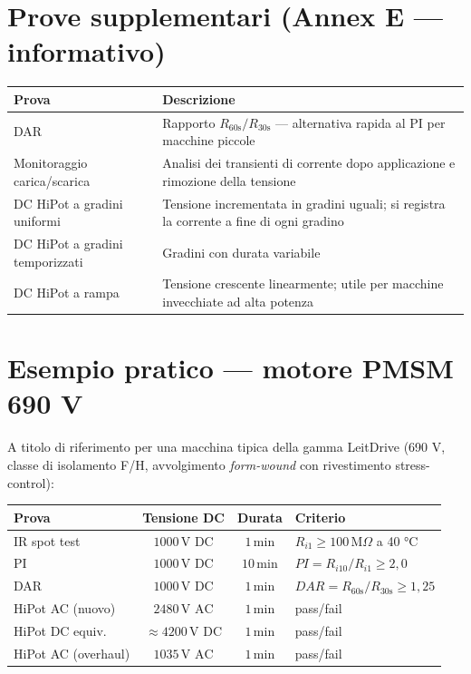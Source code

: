 \documentclass[a4paper,11pt]{article}
\begin{document}
\section{Prove supplementari (Annex E — informativo)}

\begin{center}
\begin{tabularx}{\linewidth}{lX}
\toprule
\textbf{Prova} & \textbf{Descrizione} \\
\midrule
DAR                    & Rapporto $R_{60\text{s}}/R_{30\text{s}}$ — alternativa rapida al PI per macchine piccole \\
Monitoraggio carica/scarica & Analisi dei transienti di corrente dopo applicazione e rimozione della tensione \\
DC HiPot a gradini uniformi & Tensione incrementata in gradini uguali; si registra la corrente a fine di ogni gradino \\
DC HiPot a gradini temporizzati & Gradini con durata variabile \\
DC HiPot a rampa       & Tensione crescente linearmente; utile per macchine invecchiate ad alta potenza \\
\bottomrule
\end{tabularx}
\end{center}

\section{Esempio pratico — motore PMSM 690 V}

A titolo di riferimento per una macchina tipica della gamma LeitDrive (690 V, classe di isolamento F/H, avvolgimento \emph{form-wound} con rivestimento stress-control):

\begin{center}
\begin{tabular}{lccl}
\toprule
\textbf{Prova} & \textbf{Tensione DC} & \textbf{Durata} & \textbf{Criterio} \\
\midrule
IR spot test  & $1000\,\text{V DC}$ & $1\,\text{min}$  & $R_{i1} \geq 100\,\text{M}\Omega$ a 40 °C \\
PI            & $1000\,\text{V DC}$ & $10\,\text{min}$ & $PI = R_{i10}/R_{i1} \geq 2{,}0$ \\
DAR           & $1000\,\text{V DC}$ & $1\,\text{min}$  & $DAR = R_{60\text{s}}/R_{30\text{s}} \geq 1{,}25$ \\
HiPot AC (nuovo) & $2480\,\text{V AC}$ & $1\,\text{min}$ & pass/fail \\
HiPot DC equiv.  & $\approx 4200\,\text{V DC}$ & $1\,\text{min}$ & pass/fail \\
HiPot AC (overhaul) & $1035\,\text{V AC}$ & $1\,\text{min}$ & pass/fail \\
\bottomrule
\end{tabular}
\end{center}
\end{document}
